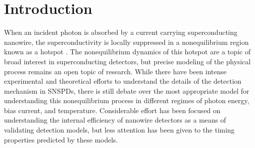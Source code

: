 \documentclass[%
reprint,
 amsmath,amssymb,
aps,
pra,
]{revtex4-1}
\begin{document}

\section{\label{sec:Intro}Introduction}
\quad When an incident photon is absorbed by a current carrying superconducting nanowire, the superconductivity is locally suppressed in a nonequilibrium region known as a hotspot \cite{goltsman_picosecond_2001}.  The nonequilibrium dynamics of this hotspot are a topic of broad interest in superconducting detectors, but precise modeling of the physical process remains an open topic of research.  While there have been intense experimental \cite{engel_temperature-dependence_2013,renema_experimental_2014,lusche_effect_2014,renema_effect_2015,marsili_hotspot_2016,gaudio_experimental_2016,caloz_optically_2017} and theoretical \cite{bulaevskii_vortex-assisted_2012,zotova_intrinsic_2014,engel_detection_2015,engel_detection_2015-1,vodolazov_vortex-assisted_2015,kozorezov_quasiparticle_2015,vodolazov_single-photon_2017,kozorezov_fano_2017}  efforts to understand the details of the detection mechanism in SNSPDs, there is still debate over the most appropriate model for understanding this nonequilibrium process in different regimes of photon energy, bias current, and temperature. Considerable effort has been focused on understanding the internal efficiency of nanowire detectors as a means of validating detection models, but less attention has been given to the timing properties predicted by these models.
\end{document}
